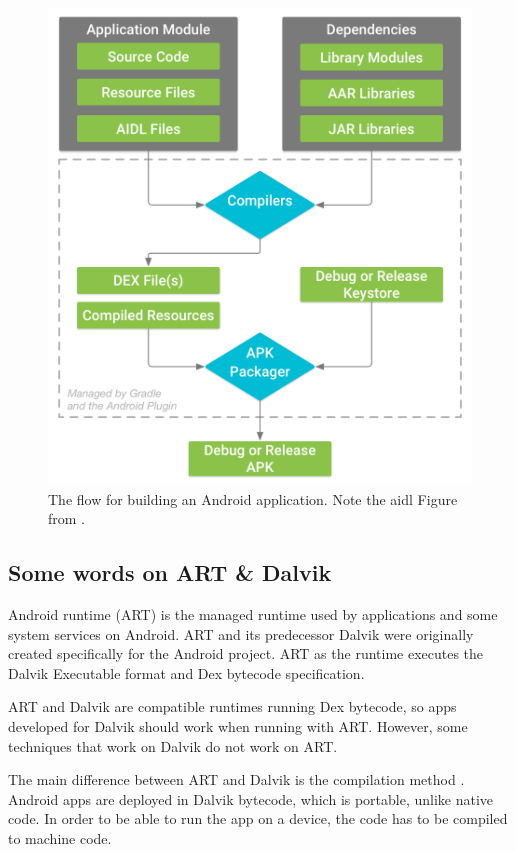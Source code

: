 \begin{figure}[hb]
	\includegraphics[width=\textwidth]{images/hello/development.png}
	\caption{The flow for building an Android application.
			Note the \gls{aidl} Figure from \cite{Developers2018build}.}
		\label{fig:develop}
\end{figure}

\subsection{Some words on ART \& Dalvik}
Android runtime (ART) \cite{Android2019} is the managed runtime used by applications and some system services on Android.
ART and its predecessor Dalvik were originally created specifically for the Android project.
ART as the runtime executes the Dalvik Executable format and Dex bytecode specification.

ART and Dalvik are compatible runtimes running Dex bytecode, so apps developed for Dalvik should work when running with ART.
However, some techniques that work on Dalvik do not work on ART.

The main difference between ART and Dalvik is the compilation method \cite{Vitas2013}.
Android apps are deployed in Dalvik bytecode, which is portable, unlike native code.
In order to be able to run the app on a device, the code has to be compiled to machine code.

